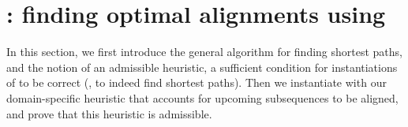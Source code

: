 \section{\astarix: finding optimal alignments using \A} \label{TRIEsec:astarix-algo}

In this section, we first introduce the general \A algorithm for finding
shortest paths, and the notion of an admissible heuristic, a sufficient
condition for instantiations of \A to be correct (\ie, to indeed find shortest
paths). Then we instantiate \A with our domain-specific heuristic that accounts
for upcoming subsequences to be aligned, and prove that this heuristic is
admissible.




